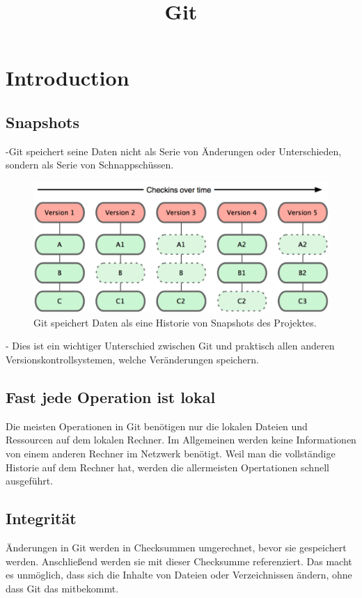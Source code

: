 \documentclass{article}
\begin{document}
\title{Git}

\section*{Introduction}
\subsection*{Snapshots}
-Git speichert seine Daten nicht als Serie von Änderungen oder Unterschieden, sondern als Serie von Schnappschüssen. \\
\begin{figure}[h!]
    \centering
    \includegraphics[width=\textwidth]{../bilder/snap.png}
    \caption{Git speichert Daten als eine Historie von Snapshots des Projektes.}
    \label{snap}
\end{figure} 
	
- Dies ist ein wichtiger Unterschied zwischen Git und praktisch allen anderen Versionskontrollsystemen, welche Veränderungen speichern.

\subsection*{Fast jede Operation ist lokal}
Die meisten Operationen in Git benötigen nur die lokalen Dateien und Ressourcen auf dem lokalen Rechner. Im Allgemeinen werden keine Informationen von einem anderen Rechner im Netzwerk benötigt. Weil man die vollständige Historie auf dem Rechner hat, werden die allermeisten Opertationen schnell ausgeführt.

\subsection*{Integrität}
Änderungen in Git werden in Checksummen umgerechnet, bevor sie gespeichert werden. Anschließend werden sie mit dieser Checksumme referenziert. Das macht es unmöglich, dass sich die Inhalte von Dateien oder Verzeichnissen ändern, ohne dass Git das mitbekommt.
\end{document}
